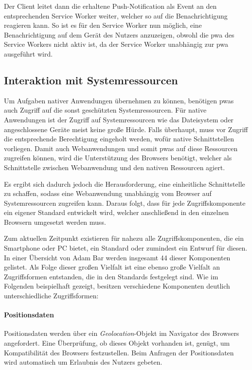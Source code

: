 \documentclass[12pt, parskip=half]{scrartcl}       %
\begin{document}
Der Client leitet dann die erhaltene Push-Notification als Event an den entsprechenden Service Worker weiter, welcher so auf die Benachrichtigung reagieren kann.
So ist es für den Service Worker nun möglich, eine Benachrichtigung auf dem Gerät des Nutzers anzuzeigen, obwohl die \ac{pwa} des Service Workers nicht aktiv ist, da der Service Worker unabhängig zur \ac{pwa} ausgeführt wird.


\subsection{Interaktion mit Systemressourcen}

Um Aufgaben nativer Anwendungen übernehmen zu können, benötigen \acp{pwa} auch Zugriff auf die sonst geschützten Systemressourcen.
Für native Anwendungen ist der Zugriff auf Systemressourcen wie das Dateisystem oder angeschlossene Geräte meist keine große Hürde.
Falls überhaupt, muss vor Zugriff die entsprechende Berechtigung eingeholt werden, wofür native Schnittstellen vorliegen.
Damit auch Webanwendungen und somit \acp{pwa} auf diese Ressourcen zugreifen können, wird die Unterstützung des Browsers benötigt, welcher als Schnittstelle zwischen Webanwendung und den nativen Ressourcen agiert.

Es ergibt sich dadurch jedoch die Herausforderung, eine einheitliche Schnittstelle zu schaffen, sodass eine Webanwendung unabhängig vom Browser auf Systemressourcen zugreifen kann.
Daraus folgt, dass für jede Zugriffskomponente ein eigener Standard entwickelt wird, welcher anschließend in den einzelnen Browsern umgesetzt werden muss.

Zum aktuellen Zeitpunkt existieren für nahezu alle Zugriffskomponenten, die ein Smartphone oder PC bietet, ein Standard oder zumindest ein Entwurf für diesen.
In einer Übersicht von Adam Bar\cite{bar_webcando} werden insgesamt 44 dieser Komponenten gelistet.
Als Folge dieser großen Vielfalt ist eine ebenso große Vielfalt an Zugriffsformen entstanden, die in den Standards festgelegt sind.
Wie im Folgenden beispielhaft gezeigt, besitzen verschiedene Komponenten deutlich unterschiedliche Zugriffsformen:

\paragraph{Positionsdaten} Positionsdaten werden über ein \textit{Geolocation}-Objekt im Navigator des Browsers angefordert.
Eine Überprüfung, ob dieses Objekt vorhanden ist, genügt, um Kompatibilität des Browsers festzustellen.
Beim Anfragen der Positionsdaten wird automatisch um Erlaubnis des Nutzers gebeten\cite{w3c_geolocation}.
\end{document}
